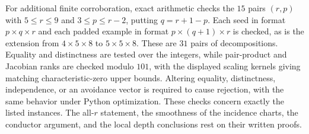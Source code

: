 For additional finite corroboration, exact arithmetic checks the
$15$ pairs $(r,p)$ with $5\leq r\leq9$ and $3\leq p\leq r-2$,
putting $q=r+1-p$. Each seed in format $p\times q\times r$
and each padded example in format $p\times(q+1)\times r$ is checked,
as is the extension from $4\times5\times8$ to $5\times5\times8$.
These are $31$ pairs of decompositions. Equality and distinctness
are tested over the integers, while pair-product and Jacobian ranks
are checked modulo $101$, with the displayed scaling kernels giving
matching characteristic-zero upper bounds. Altering equality,
distinctness, independence, or an avoidance vector is required to
cause rejection, with the same behavior under Python optimization.
These checks concern exactly the listed instances. The all-$r$
statement, the smoothness of the incidence charts, the conductor
argument, and the local depth conclusions rest on their written proofs.

